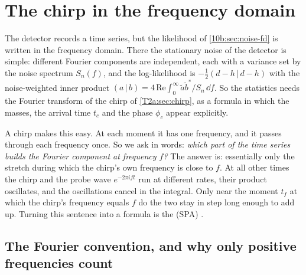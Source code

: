 \section{The chirp in the frequency domain}
\label{T2a:sec:spa}

The detector records a time series, but the likelihood of \cref{10b:sec:noise-fd} is written in the frequency domain. There the stationary noise of the detector is simple: different Fourier components are independent, each with a variance set by the noise spectrum $S_n(f)$, and the log-likelihood is $-\tfrac12(d-h\,|\,d-h)$ with the noise-weighted inner product $(a\,|\,b)=4\,\mathrm{Re}\int_0^\infty\tilde a\tilde b^*/S_n\,\dd f$. So the statistics needs the Fourier transform of the chirp of \cref{T2a:sec:chirp}, as a formula in which the masses, the arrival time $t_c$ and the phase $\phi_c$ appear explicitly.

A chirp makes this easy. At each moment it has one frequency, and it passes through each frequency once. So we ask in words: \emph{which part of the time series builds the Fourier component at frequency $f$?} The answer is: essentially only the stretch during which the chirp's own frequency is close to $f$. At all other times the chirp and the probe wave $e^{-2\pi ift}$ run at different rates, their product oscillates, and the oscillations cancel in the integral. Only near the moment $t_f$ at which the chirp's frequency equals $f$ do the two stay in step long enough to add up. Turning this sentence into a formula is the  (SPA) \cite[eq.~(21)]{CutlerFlanagan1994}.

\subsection{The Fourier convention, and why only positive frequencies count}

